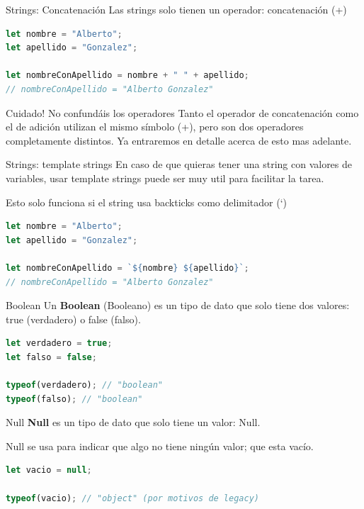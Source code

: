 \documentclass{beamer}
\begin{document}
\begin{frame}[fragile]{Strings: Concatenación}
Las strings solo tienen un operador: concatenación (+)
\begin{lstlisting}[language=JavaScript]
let nombre = "Alberto";
let apellido = "Gonzalez";

let nombreConApellido = nombre + " " + apellido;
// nombreConApellido = "Alberto Gonzalez"
\end{lstlisting}
\begin{block}{Cuidado! No confundáis los operadores}
Tanto el operador de concatenación como el de adición utilizan el mismo símbolo (+), pero son dos operadores completamente distintos. Ya entraremos en detalle acerca de esto mas adelante.
\end{block}
\end{frame}

\begin{frame}[fragile]{Strings: template strings}
En caso de que quieras tener una string con valores de variables, usar template strings puede ser muy util para facilitar la tarea.

Esto solo funciona si el string usa backticks como delimitador (`)\bigskip

\begin{lstlisting}[language=JavaScript]
let nombre = "Alberto";
let apellido = "Gonzalez";

let nombreConApellido = `${nombre} ${apellido}`;
// nombreConApellido = "Alberto Gonzalez"
\end{lstlisting}
\end{frame}

\begin{frame}[fragile]{Boolean}
Un \textbf{Boolean} (Booleano) es un tipo de dato que solo tiene dos valores: true (verdadero) o false (falso).

\begin{lstlisting}[language=JavaScript]
let verdadero = true;
let falso = false;

typeof(verdadero); // "boolean"
typeof(falso); // "boolean"

\end{lstlisting}
\end{frame}

\begin{frame}[fragile]{Null}
\textbf{Null} es un tipo de dato que solo tiene un valor: Null.

Null se usa para indicar que algo no tiene ningún valor; que esta vacío.

\begin{lstlisting}[language=JavaScript]
let vacio = null;

typeof(vacio); // "object" (por motivos de legacy)

\end{lstlisting}
\end{frame}
\end{document}

